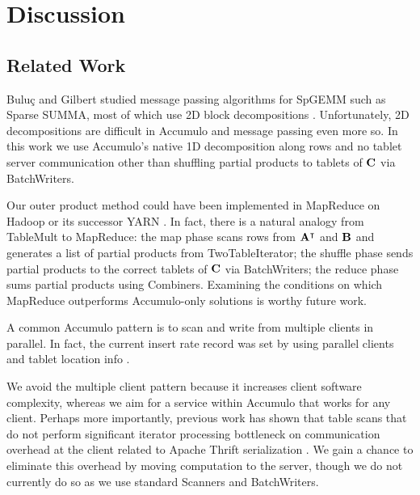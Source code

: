 
\section{Discussion}
\label{sDiscussion}

\subsection{Related Work} %
Bulu\c{c} and Gilbert studied message passing algorithms for SpGEMM
such as Sparse SUMMA, most of which use 2D block decompositions \cite{buluc2012parallel}.
Unfortunately, 2D decompositions are difficult in Accumulo 
and message passing even more so.
In this work we use Accumulo's native 1D decomposition along rows 
and no tablet server communication
other than shuffling partial products to tablets of $\mathbf{C}$ via BatchWriters.


Our outer product method could have been implemented in MapReduce %
on Hadoop or its successor YARN \cite{vavilapalli2013apache}.
In fact, there is a natural analogy from TableMult to MapReduce:
the map phase scans rows from $\mathbf{A^{\intercal}}$ and $\mathbf{B}$
and generates a list of partial products from TwoTableIterator;
the shuffle phase sends partial products to the correct tablets of $\mathbf{C}$ via BatchWriters;
the reduce phase sums partial products using Combiners.
Examining the conditions on which MapReduce outperforms Accumulo-only solutions
is worthy future work.

A common Accumulo pattern is to %
scan and write from multiple clients in parallel.
In fact, the current insert rate record was set by using 
parallel clients and tablet location info \cite{kepner2014achieving}.

We avoid the multiple client pattern because it increases client software complexity,
whereas we aim for a service within Accumulo that works for any client.
Perhaps more importantly, previous work has shown that table scans 
that do not perform significant iterator processing %
bottleneck on communication overhead at the client related to Apache Thrift serialization \cite{sawyer2013understanding}.
We gain a chance to eliminate this overhead by moving computation to the server,
though we do not currently do so as we use standard Scanners and BatchWriters.


